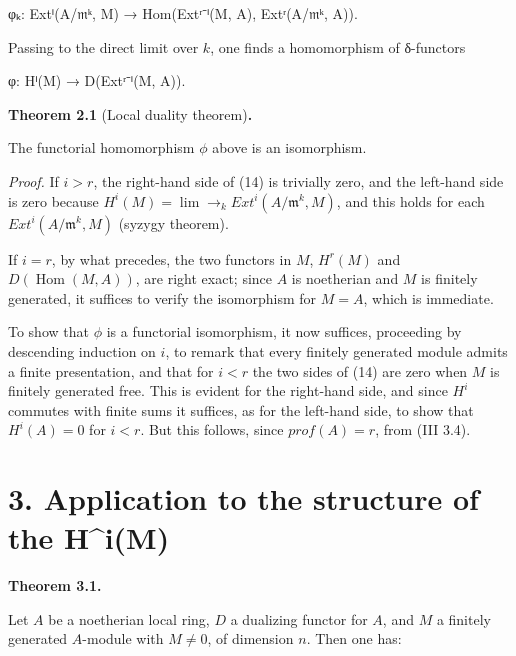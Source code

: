 \documentclass[
  11pt,
  a4paper,
]{book}
\newenvironment{Shaded}{}{}
\newcommand{\NormalTok}[1]{#1}
\begin{document}
\begin{Shaded}
\begin{Highlighting}[]
\NormalTok{φₖ: Extⁱ(A/𝔪ᵏ, M) → Hom(Extʳ⁻ⁱ(M, A), Extʳ(A/𝔪ᵏ, A)).}
\end{Highlighting}
\end{Shaded}

Passing to the direct limit over \(k\), one finds a homomorphism of
δ-functors

\begin{Shaded}
\begin{Highlighting}[]
\NormalTok{φ: Hⁱ(M) → D(Extʳ⁻ⁱ(M, A)).}
\end{Highlighting}
\end{Shaded}

\textbf{Theorem 2.1} (Local duality theorem)\textbf{.}

The functorial homomorphism \(\phi\) above is an isomorphism.

\emph{Proof.} If \(i > r\), the right-hand side of (14) is trivially
zero, and the left-hand side is zero because \(H^{i}(M) =
\lim\to_{k} Ext^{i}(A/\mathfrak{m}^{k}, M)\), and this holds for each
\(Ext^{i}(A/\mathfrak{m}^{k}, M)\) (syzygy theorem).

If \(i = r\), by what precedes, the two functors in \(M\), \(H^{r}(M)\)
and \(D(\operatorname{Hom}(M, A))\), are right exact; since \(A\) is
noetherian and \(M\) is finitely generated, it suffices to verify the
isomorphism for \(M = A\), which is immediate.

To show that \(\phi\) is a functorial isomorphism, it now suffices,
proceeding by descending induction on \(i\), to remark that every
finitely generated module admits a finite presentation, and that for
\(i < r\) the two sides of (14) are zero when \(M\) is finitely
generated free. This is evident for the right-hand side, and since
\(H^{i}\) commutes with finite sums it suffices, as for the left-hand
side, to show that \(H^{i}(A) = 0\) for \(i < r\). But this follows,
since \(prof(A) =
r\), from (III 3.4).

\section{3. Application to the structure of the
H\^{}i(M)}\label{application-to-the-structure-of-the-him}

\textbf{Theorem 3.1.}

Let \(A\) be a noetherian local ring, \(D\) a dualizing functor for
\(A\), and \(M\) a finitely generated \(A\)-module with \(M
\neq 0\), of dimension \(n\). Then one has:
\end{document}
